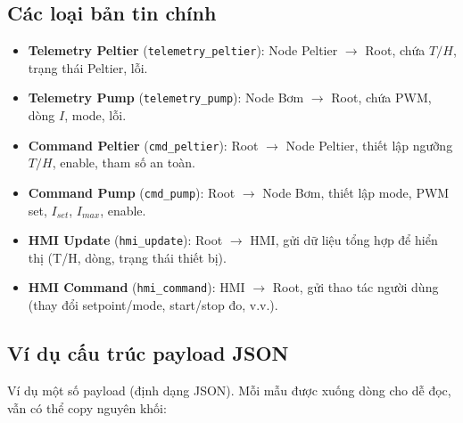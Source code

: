 \documentclass[12pt,a4paper]{report}
\begin{document}
\subsection{Các loại bản tin chính}
\begin{itemize}
  \item \textbf{Telemetry Peltier} (\texttt{telemetry\_peltier}): Node Peltier $\rightarrow$ Root, chứa $T/H$, trạng thái Peltier, lỗi.
  \item \textbf{Telemetry Pump} (\texttt{telemetry\_pump}): Node Bơm $\rightarrow$ Root, chứa PWM, dòng $I$, mode, lỗi.
  \item \textbf{Command Peltier} (\texttt{cmd\_peltier}): Root $\rightarrow$ Node Peltier, thiết lập ngưỡng $T/H$, enable, tham số an toàn.
  \item \textbf{Command Pump} (\texttt{cmd\_pump}): Root $\rightarrow$ Node Bơm, thiết lập mode, PWM set, $I_{set}$, $I_{max}$, enable.
  \item \textbf{HMI Update} (\texttt{hmi\_update}): Root $\rightarrow$ HMI, gửi dữ liệu tổng hợp để hiển thị (T/H, dòng, trạng thái thiết bị).
  \item \textbf{HMI Command} (\texttt{hmi\_command}): HMI $\rightarrow$ Root, gửi thao tác người dùng (thay đổi setpoint/mode, start/stop đo, v.v.).
\end{itemize}

\subsection{Ví dụ cấu trúc payload JSON}
Ví dụ một số payload (định dạng JSON). Mỗi mẫu được xuống dòng cho dễ đọc, vẫn có thể copy nguyên khối:
\end{document}
